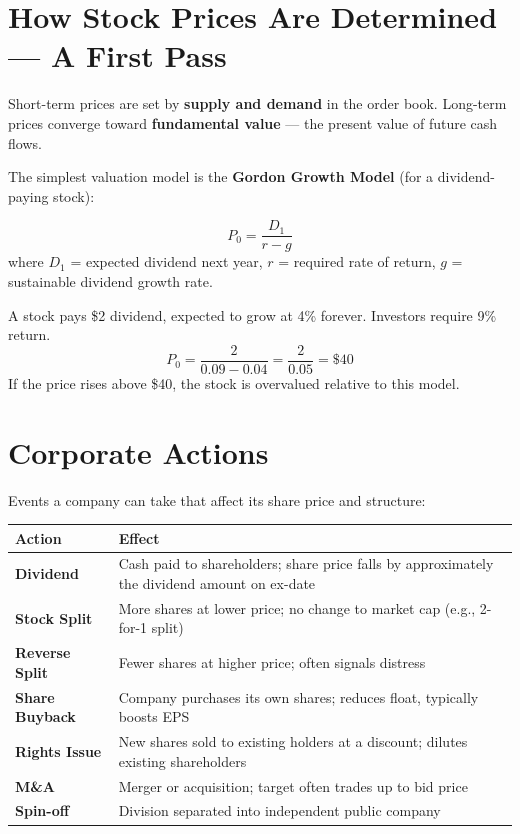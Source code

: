 \section{How Stock Prices Are Determined — A First Pass}

Short-term prices are set by \textbf{supply and demand} in the order book.
Long-term prices converge toward \textbf{fundamental value} — the present value of future cash flows.

The simplest valuation model is the \textbf{Gordon Growth Model} (for a dividend-paying stock):

\begin{formulabox}
\[
  P_0 = \frac{D_1}{r - g}
\]
where $D_1$ = expected dividend next year, $r$ = required rate of return, $g$ = sustainable
dividend growth rate.
\end{formulabox}

\begin{examplebox}
A stock pays \$2 dividend, expected to grow at 4\% forever. Investors require 9\% return.
\[
  P_0 = \frac{2}{0.09 - 0.04} = \frac{2}{0.05} = \$40
\]
If the price rises above \$40, the stock is overvalued relative to this model.
\end{examplebox}

\section{Corporate Actions}

Events a company can take that affect its share price and structure:

\begin{center}
\begin{tabular}{>{\bfseries}p{3.5cm} p{9cm}}
\toprule
Action & Effect \\
\midrule
Dividend & Cash paid to shareholders; share price falls by approximately the dividend amount on ex-date \\
Stock Split & More shares at lower price; no change to market cap (e.g., 2-for-1 split) \\
Reverse Split & Fewer shares at higher price; often signals distress \\
Share Buyback & Company purchases its own shares; reduces float, typically boosts EPS \\
Rights Issue & New shares sold to existing holders at a discount; dilutes existing shareholders \\
M\&A & Merger or acquisition; target often trades up to bid price \\
Spin-off & Division separated into independent public company \\
\bottomrule
\end{tabular}
\end{center}
